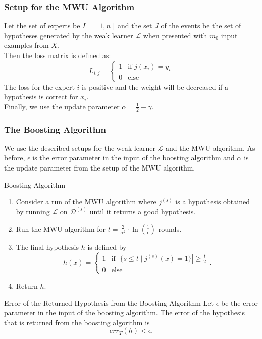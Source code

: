 \documentclass[english]{panikzettel}
\begin{document}
\subsubsection{Setup for the MWU Algorithm}
Let the set of experts be $I=[1,n]$ and the set $J$ of the events be the set of hypotheses generated by the weak learner $\mathcal{L}$ when presented with $m_0$ input examples from $X$.\\
Then the loss matrix is defined as:
\[
L_{i,j} =
\begin{cases}
1 & \text{if } j(x_i)=y_i\\
0 & \text{else}
\end{cases}
\]
The loss for the expert $i$ is positive and the weight will be decreased if a hypothesis is correct for $x_i$.\\
Finally, we use the update parameter $\alpha=\frac{1}{2}-\gamma$.

\subsubsection{The Boosting Algorithm}
We use the described setups for the weak learner $\mathcal{L}$ and the MWU algorithm. As before, $\epsilon$ is the error parameter in the input of the boosting algorithm and $\alpha$ is the update parameter from the setup of the MWU algorithm.

\begin{halfboxl}
\vspace{-\baselineskip}
\begin{algo}{Boosting Algorithm}
\begin{enumerate}
\item Consider a run of the MWU algorithm where $j^{(s)}$ is a hypothesis obtained by running $\mathcal{L}$ on $\mathcal{D}^{(s)}$ until it returns a good hypothesis.
\item Run the MWU algorithm for $t=\frac{2}{\alpha^2}\cdot \ln(\frac{1}{\epsilon})$ rounds.
\item The final hypothesis $h$ is defined by
\[
h(x)=
\begin{cases}
1 & \text{if } |\{s\leq t\mid j^{(s)}(x)=1 \}|\geq \frac{t}{2}\\
0 & \text{else}
\end{cases}
.
\]
\item Return $h$.
\end{enumerate}
\end{algo}

\end{halfboxl}
\begin{halfboxr}
\vspace{-\baselineskip}
\begin{theo}{Error of the Returned Hypothesis from the Boosting Algorithm}
Let $\epsilon$ be the error parameter in the input of the boosting algorithm. The error of the hypothesis that is returned from the boosting algorithm is
\[
err_T(h)<\epsilon.
\]
\end{theo}
\end{halfboxr}
\end{document}
